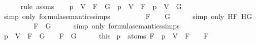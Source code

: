 \begin{isabellebody}
\ \ \ \ \isamarkupfalse%
\ {\isacharparenleft}rule\ assms{\isacharparenleft}{}{\isacharparenright}{\isacharparenright}\isanewline
\ \ \isamarkupfalse%
\ {\isachardoublequoteopen}{\isasymA}{\isacharparenleft}p\ {\isacharcolon}{\isacharequal}\ V{\isacharparenright}\ {\isasymTurnstile}\ {\isacharparenleft}F\ \isactrlbold {\isasymrightarrow}\ G{\isacharparenright}\ {\isacharequal}\ {\isacharparenleft}{\isasymA}{\isacharparenleft}p\ {\isacharcolon}{\isacharequal}\ V{\isacharparenright}\ {\isasymTurnstile}\ F\ {\isasymlongrightarrow}\ {\isasymA}{\isacharparenleft}p\ {\isacharcolon}{\isacharequal}\ V{\isacharparenright}\ {\isasymTurnstile}\ G{\isacharparenright}{\isachardoublequoteclose}\isanewline
\ \ \ \ \isamarkupfalse%
\ {\isacharparenleft}simp\ only{\isacharcolon}\ formula{\isacharunderscore}semantics{\isachardot}simps{\isacharparenleft}{}{\isacharparenright}{\isacharparenright}\isanewline
\ \ \isamarkupfalse%
\ \isamarkupfalse%
\ {\isachardoublequoteopen}{\isasymdots}\ {\isacharequal}\ {\isacharparenleft}{\isasymA}\ {\isasymTurnstile}\ F\ {\isasymlongrightarrow}\ {\isasymA}\ {\isasymTurnstile}\ G{\isacharparenright}{\isachardoublequoteclose}\isanewline
\ \ \ \ \isamarkupfalse%
\ {\isacharparenleft}simp\ only{\isacharcolon}\ HF\ HG{\isacharparenright}\isanewline
\ \ \isamarkupfalse%
\ \isamarkupfalse%
\ {\isachardoublequoteopen}{\isasymdots}\ {\isacharequal}\ {\isasymA}\ {\isasymTurnstile}\ {\isacharparenleft}F\ \isactrlbold {\isasymrightarrow}\ G{\isacharparenright}{\isachardoublequoteclose}\isanewline
\ \ \ \ \isamarkupfalse%
\ {\isacharparenleft}simp\ only{\isacharcolon}\ formula{\isacharunderscore}semantics{\isachardot}simps{\isacharparenleft}{}{\isacharparenright}{\isacharparenright}\isanewline
\ \ \isamarkupfalse%
\ \isamarkupfalse%
\ {\isachardoublequoteopen}{\isasymA}{\isacharparenleft}p\ {\isacharcolon}{\isacharequal}\ V{\isacharparenright}\ {\isasymTurnstile}\ {\isacharparenleft}F\ \isactrlbold {\isasymrightarrow}\ G{\isacharparenright}\ {\isasymlongleftrightarrow}\ {\isasymA}\ {\isasymTurnstile}\ {\isacharparenleft}F\ \isactrlbold {\isasymrightarrow}\ G{\isacharparenright}{\isachardoublequoteclose}\isanewline
\ \ \ \ \isamarkupfalse%
\ this\isanewline
{}\isamarkupfalse%
%
\endisatagproof
{\isafoldproof}%
%
\isadelimproof
\isanewline
%
\endisadelimproof
\isanewline
{}\isamarkupfalse%
\ {\isachardoublequoteopen}p\ {\isasymnotin}\ atoms\ F\ {\isasymLongrightarrow}\ {\isacharparenleft}{\isasymA}{\isacharparenleft}p\ {\isacharcolon}{\isacharequal}\ V{\isacharparenright}{\isacharparenright}\ {\isasymTurnstile}\ F\ {\isasymlongleftrightarrow}\ {\isasymA}\ {\isasymTurnstile}\ F{\isachardoublequoteclose}\isanewline

\end{isabellebody}
